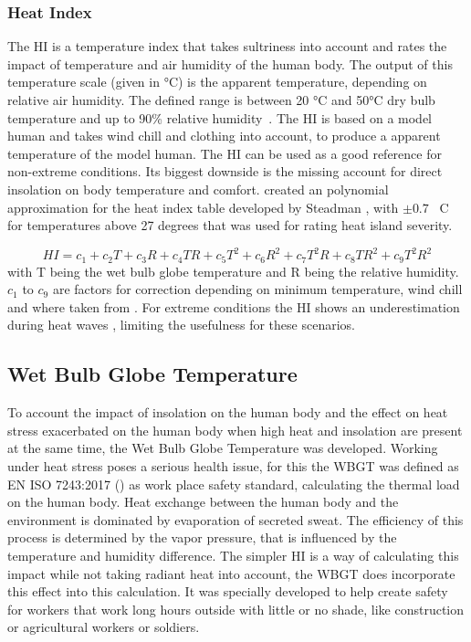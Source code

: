 \documentclass[12pt,a4paper, english,twoside]{scrartcl}
\begin{document}
    \subsubsection{Heat Index}\label{sec:heatIndex}
    The \gls{HI} is a temperature index that takes sultriness into account and rates the impact of temperature and air humidity of the human body. 
    The output of this temperature scale (given in °C) is the apparent temperature, depending on relative air humidity. 
    The defined range is between 20 °C and 50°C dry bulb temperature and up to 90\% relative humidity~\autocite[p. 862]{Steadman1979}. 
    The \gls{HI} is based on a model human and takes wind chill and clothing into account, to produce a apparent temperature of the model human. 
    The \gls{HI} can be used as a good reference for non-extreme conditions. 
    Its biggest downside is the missing account for direct insolation on body temperature and comfort.
    \Cite{Schoen2005} created an polynomial approximation for the heat index table developed by Steadman \autocite{Steadman1979}, with $\pm 0.7$ \textdegree\ C for temperatures above 27 degrees that was used for rating heat island severity.

    \begin{equation}
      HI = c_1 + c_2 T + c_3 R + c_4 T R + c_5 T^2 + c_6 R^2 + c_7 T^2 R + c_8 T R^2 + c_9 T^2 R^2
    \end{equation}
    with T being the wet bulb globe temperature and R being the relative humidity. 
    $c_1$ to $c_9$ are factors for correction depending on minimum temperature, wind chill and where taken from \cite[p.3]{h}.
    For extreme conditions the \gls{HI} shows an underestimation during heat waves \autocite{Romps2022}, limiting the usefulness for these scenarios.
    \subsection{Wet Bulb Globe Temperature}\label{sec:WBGT}
     To account the impact of insolation on the human body and the effect on heat stress exacerbated on the human body when high heat and insolation are present at the same time, the Wet Bulb Globe Temperature was developed. 
     Working under heat stress poses a serious health issue, for this the \gls{WBGT} was defined as EN ISO 7243:2017 (\cite{Iso7243_2017}) as work place safety standard, calculating the thermal load on the human body.
     Heat exchange between the human body and the environment is dominated by evaporation of secreted sweat.
     The efficiency of this process is determined by the vapor pressure, that is influenced by the temperature and humidity difference.
     The simpler \gls{HI} is a way of calculating this impact while not taking radiant heat into account, the \gls{WBGT} does incorporate this effect into this calculation.
     It was specially developed to help create safety for workers that work long hours outside with little or no shade, like construction or agricultural workers or soldiers.
\newpage
\end{document}
